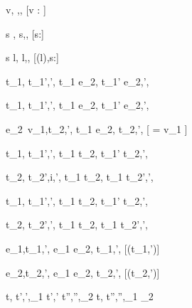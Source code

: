   { }
  {\Edit v,\sigma \handle{\Empty} \Enter \tau,\sigma,\True}
  [v : \tau]

  { s}
  {\Enter \tau,\sigma {} \Edit s,\sigma,\True}
  [s:\tau]

  { s}
  {\Update l,\sigma {} \Update l,\sigma[l \mapsto s],\True}
  [\sigma(l),s:\tau]

  {t_1,\sigma {} t_1',\sigma',\phi}
  {t_1 \Then e_2,\sigma {} t_1' \Then e_2,\sigma',\phi}

  {t_1,\sigma {} t_1',\sigma',\phi}
  {t_1 \Next e_2,\sigma {} t_1' \Next e_2,\sigma',\phi}

  {e_2\ v_1,\sigma \normalise t_2,\sigma',\phi}
  {t_1 \Next e_2,\sigma \handle{\Continue} t_2,\sigma',\phi}
  [ = v_1 \land \neg{}]


  {t_1,\sigma {} t_1',\sigma',\phi}
  {t_1 \And t_2,\sigma {} t_1' \And t_2,\sigma',\phi}

  {t_2,\sigma {} t_2',i,\sigma',\phi}
  {t_1 \And t_2,\sigma {} t_1 \And t_2',\sigma',\phi}


  {t_1,\sigma {} t_1',\sigma',\phi}
  {t_1 \Or t_2,\sigma {} t_1' \Or t_2,\sigma',\phi}

  {t_2,\sigma {} t_2',\sigma',\phi }
  {t_1 \Or t_2,\sigma {} t_1 \Or t_2',\sigma',\phi}


  {e_1,\sigma \normalise t_1,\sigma',\phi}
  {e_1 \Xor e_2,\sigma \handle{\Left} t_1,\sigma',\phi}
  [\neg\Failing(t_1,\sigma')]

  {e_2,\sigma \normalise t_2,\sigma',\phi}
  {e_1 \Xor e_2,\sigma \handle{\Right} t_2,\sigma',\phi}
  [\neg\Failing(t_2,\sigma')]





  {t,\sigma {} t',\sigma',\phi_1 \Quad
   t',\sigma' \normalise t'',\sigma'',\phi_2}
  {t,\sigma {} t'',\sigma'',\phi_1 \land \phi_2}
